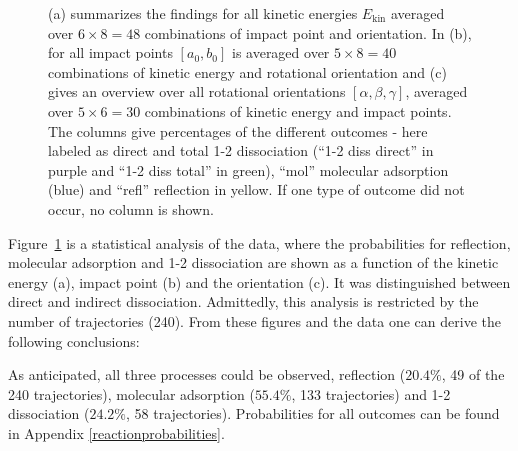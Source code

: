 \documentclass[11pt,DIV=13,BCOR=5mm,a4paper,headinclude]{scrbook}
\begin{document}
\begin{figure}[!h]
{(a) summarizes the findings for all kinetic energies $E_\textrm{kin}$ averaged over $6\times 8=48$ combinations of impact point and orientation.
In (b), for all impact points $[a_0,b_0]$ is averaged over $5 \times 8=40$ combinations of kinetic energy and rotational orientation and (c) gives an overview over all rotational orientations $[\alpha,\beta,\gamma]$, averaged over $5 \times 6=30$ combinations of kinetic energy and impact points.
The columns give percentages of the different outcomes - here labeled as direct and total 1-2 dissociation (``1-2 diss direct'' in purple and  ``1-2 diss total'' in green), ``mol'' molecular adsorption (blue) and ``refl'' reflection in yellow.
If one type of outcome did not occur, no column is shown.}
\label{abb:barchart_mic}
\end{figure}
Figure~\ref{abb:barchart_mic} is a statistical analysis of the data, where the probabilities for reflection, molecular adsorption and 1-2 dissociation are shown as a function of the kinetic energy (a), impact point (b) and the orientation (c).
It was distinguished between direct and indirect dissociation.
Admittedly, this analysis is restricted by the number of trajectories (240).
From these figures and the data one can derive the following conclusions:


As anticipated, all three processes could be observed, reflection ($20.4\%$, 49 of the 240 trajectories), molecular adsorption ($55.4\%$, 133 trajectories) and 1-2 dissociation ($24.2\%$, 58 trajectories).
Probabilities for all outcomes can be found in Appendix \ref{reactionprobabilities}.
\end{document}

